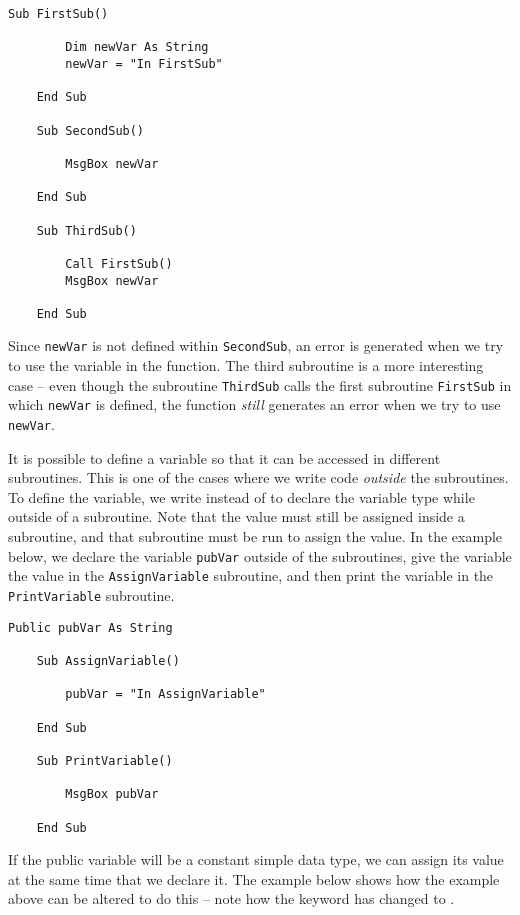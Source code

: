 \documentclass[11pt]{article}%
\begin{document}
\begin{lstlisting}[style=A]
    Sub FirstSub()

        Dim newVar As String
        newVar = "In FirstSub"

    End Sub

    Sub SecondSub()

        MsgBox newVar

    End Sub

    Sub ThirdSub()

        Call FirstSub()
        MsgBox newVar

    End Sub
\end{lstlisting}

Since \texttt{newVar} is not defined within \texttt{SecondSub}, an error is generated when we try to use the variable in the  function. The third subroutine is a more interesting case -- even though the subroutine \texttt{ThirdSub} calls the first subroutine \texttt{FirstSub} in which \texttt{newVar} is defined, the  function \textit{still} generates an error when we try to use \texttt{newVar}.

It is possible to define a variable so that it can be accessed in different subroutines. This is one of the cases where we write code \textit{outside} the subroutines. To define the variable, we write  instead of  to declare the variable type while outside of a subroutine. Note that the value must still be assigned inside a subroutine, and that subroutine must be run to assign the value. In the example below, we declare the variable \texttt{pubVar} outside of the subroutines, give the variable the value in the \texttt{AssignVariable} subroutine, and then print the variable in the \texttt{PrintVariable} subroutine.\\

\begin{lstlisting}[style=A]
    Public pubVar As String

    Sub AssignVariable()

        pubVar = "In AssignVariable"

    End Sub

    Sub PrintVariable()

        MsgBox pubVar

    End Sub
\end{lstlisting}

If the public variable will be a constant simple data type, we can assign its value at the same time that we declare it. The example below shows how the example above can be altered to do this -- note how the  keyword has changed to .\\
\end{document}
